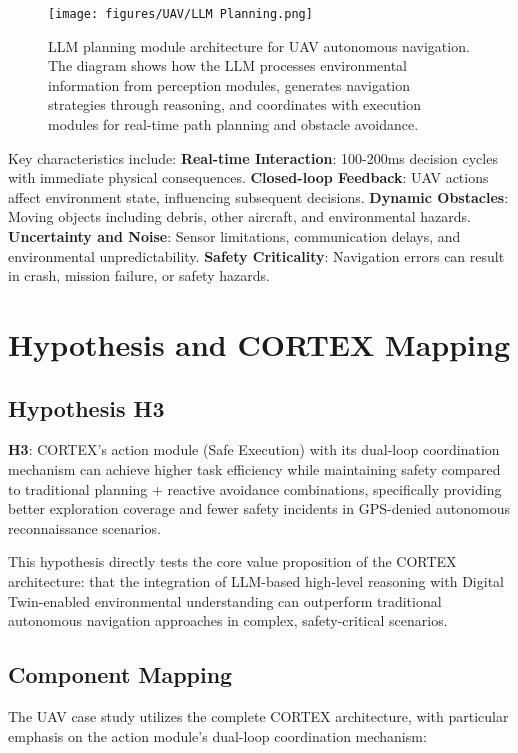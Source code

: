 \begin{figure}[htbp]
\centering
\texttt{[image: figures/UAV/LLM Planning.png]}
\caption{LLM planning module architecture for UAV autonomous navigation. The diagram shows how the LLM processes environmental information from perception modules, generates navigation strategies through reasoning, and coordinates with execution modules for real-time path planning and obstacle avoidance.}
\label{fig:llm_planning}
\end{figure}

Key characteristics include:
\textbf{Real-time Interaction}: 100-200ms decision cycles with immediate physical consequences.
\textbf{Closed-loop Feedback}: UAV actions affect environment state, influencing subsequent decisions.
\textbf{Dynamic Obstacles}: Moving objects including debris, other aircraft, and environmental hazards.
\textbf{Uncertainty and Noise}: Sensor limitations, communication delays, and environmental unpredictability.
\textbf{Safety Criticality}: Navigation errors can result in crash, mission failure, or safety hazards.

\section{Hypothesis and CORTEX Mapping}

\subsection{Hypothesis H3}

\textbf{H3}: CORTEX's action module (Safe Execution) with its dual-loop coordination mechanism can achieve higher task efficiency while maintaining safety compared to traditional planning + reactive avoidance combinations, specifically providing better exploration coverage and fewer safety incidents in GPS-denied autonomous reconnaissance scenarios.

This hypothesis directly tests the core value proposition of the CORTEX architecture: that the integration of LLM-based high-level reasoning with Digital Twin-enabled environmental understanding can outperform traditional autonomous navigation approaches in complex, safety-critical scenarios.

\subsection{Component Mapping}

The UAV case study utilizes the complete CORTEX architecture, with particular emphasis on the action module's dual-loop coordination mechanism:

